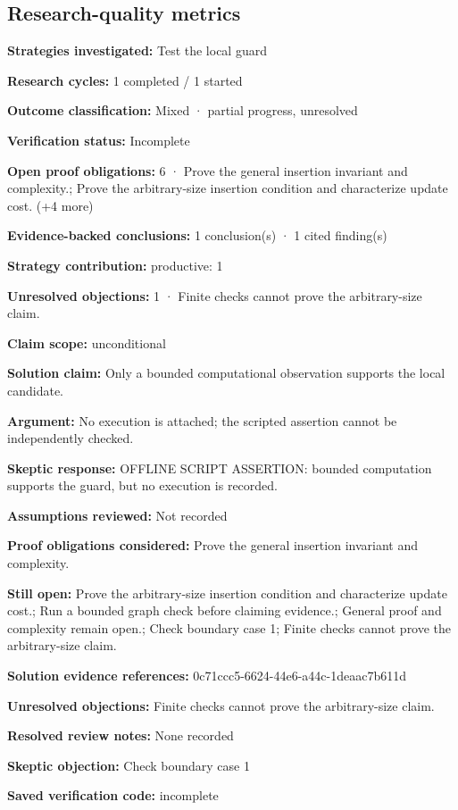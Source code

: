 \documentclass[11pt]{article}
\begin{document}
\subsection{Research-quality metrics}
\textbf{Strategies investigated:} Test the local guard\par
\textbf{Research cycles:} 1 completed / 1 started\par
\textbf{Outcome classification:} Mixed · partial progress, unresolved\par
\textbf{Verification status:} Incomplete\par
\textbf{Open proof obligations:} 6 · Prove the general insertion invariant and complexity.; Prove the arbitrary-size insertion condition and characterize update cost. (+4 more)\par
\textbf{Evidence-backed conclusions:} 1 conclusion(s) · 1 cited finding(s)\par
\textbf{Strategy contribution:} productive: 1\par
\textbf{Unresolved objections:} 1 · Finite checks cannot prove the arbitrary-size claim.\par
\textbf{Claim scope:} unconditional\par
\textbf{Solution claim:} Only a bounded computational observation supports the local candidate.\par
\textbf{Argument:} No execution is attached; the scripted assertion cannot be independently checked.\par
\textbf{Skeptic response:} OFFLINE SCRIPT ASSERTION: bounded computation supports the guard, but no execution is recorded.\par
\textbf{Assumptions reviewed:} Not recorded\par
\textbf{Proof obligations considered:} Prove the general insertion invariant and complexity.\par
\textbf{Still open:} Prove the arbitrary-size insertion condition and characterize update cost.; Run a bounded graph check before claiming evidence.; General proof and complexity remain open.; Check boundary case 1; Finite checks cannot prove the arbitrary-size claim.\par
\textbf{Solution evidence references:} 0c71ccc5-6624-44e6-a44c-1deaac7b611d\par
\textbf{Unresolved objections:} Finite checks cannot prove the arbitrary-size claim.\par
\textbf{Resolved review notes:} None recorded\par
\textbf{Skeptic objection:} Check boundary case 1\par
\textbf{Saved verification code:} incomplete\par
\end{document}
